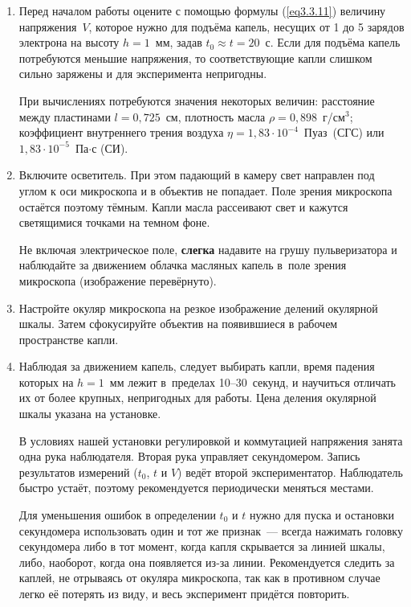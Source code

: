 \begin{enumerate}

\item{Перед началом работы оцените с помощью формулы (\ref{eq3.3.11}) величину напряжения~$V$, которое нужно для подъёма капель, несущих от 1 до 5 зарядов электрона на высоту $h=1$~мм, задав $t_0\approx t=20$~с. Если для подъёма капель потребуются меньшие напряжения, то соответствующие капли слишком сильно заряжены и для эксперимента непригодны.

При вычислениях потребуются значения некоторых величин: расстояние между пластинами $l=0,725$~см, плотность масла
$\rho=0,898$~г/см$^3$; коэффициент внутреннего трения воздуха $\eta=1,83\cdot 10^{-4}$~Пуаз~(СГС) или $1,83\cdot 10^{-5}$~Па$\cdot$с
(СИ).}

\item{ Включите осветитель. При этом падающий в камеру свет направлен под углом к оси микроскопа и в объектив не попадает. Поле зрения микроскопа остаётся поэтому тёмным. Капли масла рассеивают свет и кажутся светящимися точками на темном фоне.

Не включая электрическое поле, {\bf слегка} надавите на грушу пульверизатора  и наблюдайте за движением облачка масляных капель в~поле зрения микроскопа (изображение перевёрнуто).}

\item{ Настройте окуляр микроскопа на резкое изображение делений окулярной шкалы. Затем сфокусируйте объектив на появившиеся в рабочем пространстве капли.}

\item{ Наблюдая за движением капель, следует выбирать капли, время падения которых на $h=1$~мм лежит в~пределах
10--30~секунд, и научиться отличать их от более крупных, непригодных для работы. Цена деления окулярной шкалы указана на установке.

В условиях нашей установки регулировкой и коммутацией напряжения занята одна рука наблюдателя. Вторая рука управляет секундомером. Запись результатов измерений ($t_0$, $t$ и $V$) ведёт второй экспериментатор. Наблюдатель быстро устаёт, поэтому рекомендуется периодически меняться местами.

Для уменьшения ошибок в определении $t_0$ и $t$ нужно для пуска и остановки секундомера использовать один и тот же признак~--- всегда нажимать головку секундомера либо в тот момент, когда капля скрывается за линией шкалы, либо, наоборот, когда она появляется из-за линии. Рекомендуется следить за каплей, не отрываясь от окуляра микроскопа, так как в противном случае легко её потерять из виду, и весь эксперимент придётся повторить.}


\end{enumerate}
